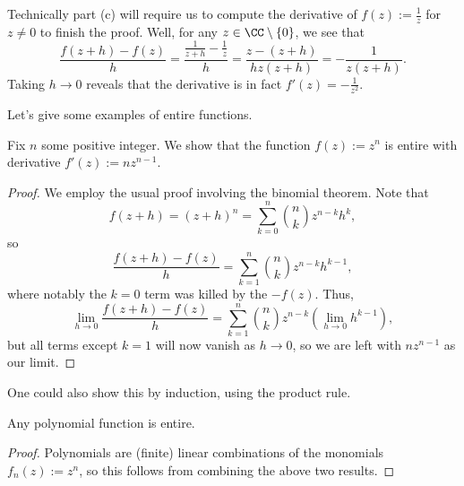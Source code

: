 \begin{remark}[Nir]
	Technically part (c) will require us to compute the derivative of $f(z):=\frac1z$ for $z\ne0$ to finish the proof. Well, for any $z\in\CC\setminus\{0\}$, we see that
	\[\frac{f(z+h)-f(z)}h=\frac{\frac1{z+h}-\frac1z}{h}=\frac{z-(z+h)}{hz(z+h)}=-\frac1{z(z+h)}.\]
	Taking $h\to0$ reveals that the derivative is in fact $f'(z)=-\frac1{z^2}$.
\end{remark}
Let's give some examples of entire functions.
\begin{exe}
	Fix $n$ some positive integer. We show that the function $f(z):=z^n$ is entire with derivative $f'(z):=nz^{n-1}$.
\end{exe}
\begin{proof}
	We employ the usual proof involving the binomial theorem. Note that
	\[f(z+h)=(z+h)^n=\sum_{k=0}^n\binom nkz^{n-k}h^k,\]
	so
	\[\frac{f(z+h)-f(z)}h=\sum_{k=1}^n\binom nkz^{n-k}h^{k-1},\]
	where notably the $k=0$ term was killed by the $-f(z)$. Thus,
	\[\lim_{h\to0}\frac{f(z+h)-f(z)}h=\sum_{k=1}^n\binom nkz^{n-k}\left(\lim_{h\to0}h^{k-1}\right),\]
	but all terms except $k=1$ will now vanish as $h\to0$, so we are left with $nz^{n-1}$ as our limit.
\end{proof}
\begin{remark}[Nir]
	One could also show this by induction, using the product rule.
\end{remark}
\begin{corollary}
	Any polynomial function is entire.
\end{corollary}
\begin{proof}
	Polynomials are (finite) linear combinations of the monomials $f_n(z):=z^n$, so this follows from combining the above two results.
\end{proof}

